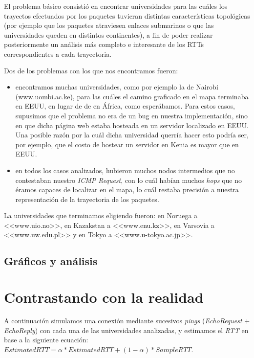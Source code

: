 \documentclass[final,inline,a4paper,narroweqnarray]{ieee}
\let\Oldsection\section
\renewcommand{\section}{\FloatBarrier\Oldsection}
\let\Oldsubsection\subsection
\renewcommand{\subsection}{\FloatBarrier\Oldsubsection}
\begin{document}
El problema básico consistió en encontrar universidades para las cuáles los trayectos efectuados por los paquetes 
tuvieran distintas características topológicas (por ejemplo que los paquetes atraviesen enlaces submarinos o que
las universidades queden en distintos continentes), a fin 
de poder realizar posteriormente un análisis más completo e interesante de los RTTs correspondientes a cada trayectoria.  

Dos de los problemas con los que nos encontramos fueron:
\begin{itemize}
	\item encontramos muchas universidades, como por ejemplo la de Nairobi (www.uombi.ac.ke), 
para las cuáles el camino graficado en el mapa terminaba en EEUU, en lugar de de en África, como esperábamos. Para estos
casos, supusimos que el problema no era de un bug en nuestra implementación, sino en que dicha página web estaba hosteada
en un servidor localizado en EEUU. Una posible razón por la cuál dicha universidad querría hacer esto podría ser, por 
ejemplo, que el costo de hostear un servidor en Kenia es mayor que en EEUU.
	\item en todos los casos analizados, hubieron muchos nodos intermedios que no contestaban nuestro \emph{ICMP Request}, con
lo cuál habían muchos \emph{hops} que no éramos capaces de localizar en el mapa, lo cuál restaba precisión a nuestra 
representación de la trayectoria de los paquetes.
\end{itemize}

La universidades que terminamos eligiendo fueron: en Noruega a <<www.uio.no>>, en Kazakstan a
 <<www.enu.kz>>, en Varsovia a <<www.uw.edu.pl>> y en Tokyo a <<www.u-tokyo.ac.jp>>.

\subsection{Gráficos y análisis}

\section{ Contrastando con la realidad }
A continuación simulamos una conexión mediante sucesivos \emph{pings} (\emph{EchoRequest} $+$ \emph{EchoReply}) con cada una de las universidades analizadas, y estimamos el \emph{RTT} en base a la siguiente ecuación: $ EstimatedRTT = \alpha * EstimatedRTT + (1 - \alpha) * SampleRTT $. 
\end{document}
